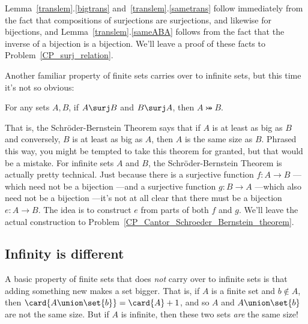 Lemma~\ref{translem}.\ref{bigtrans} and~\ref{translem}.\ref{sametrans}
follow immediately from the fact that compositions of surjections are
surjections, and likewise for bijections, and
Lemma~\ref{translem}.\ref{sameABA} follows from the fact that the
inverse of a bijection is a bijection.  We'll leave a proof of these
facts to Problem~\ref{CP_surj_relation}.

Another familiar property of finite sets carries over to infinite sets,
but this time it's not so obvious:
\begin{theorem}  For any sets $A,B$, if $A \surj B$
  and $B \surj A$, then $A \bij B$.
\end{theorem}

That is, the Schr\"oder-Bernstein Theorem says that if $A$ is at least as
big as $B$ and conversely, $B$ is at least as big as $A$, then $A$ is the
same size as $B$.  Phrased this way, you might be tempted to take this
theorem for granted, but that would be a mistake.  For infinite sets $A$
and $B$, the Schr\"oder-Bernstein Theorem is actually pretty technical.
Just because there is a surjective function $f:A\to B$ ---which need not
be a bijection ---and a surjective function $g:B \to A$ ---which also need
not be a bijection ---it's not at all clear that there must be a bijection
$e:A \to B$.  The idea is to construct $e$ from parts of both $f$ and $g$.
We'll leave the actual construction to
Problem~\ref{CP_Cantor_Schroeder_Bernstein_theorem}.

\subsection{Infinity is different}

A basic property of finite sets that does \emph{not} carry over to
infinite sets is that adding something new makes a set bigger.  That is,
if $A$ is a finite set and $b \notin A$, then $\card{A \union \set{b}} =
\card{A}+1$, and so $A$ and $A \union \set{b}$ are not the same size.  But
if $A$ is infinite, then these two sets \emph{are} the same size!


